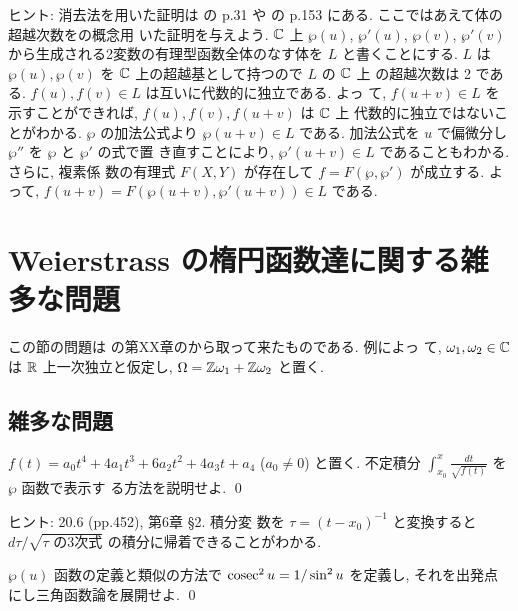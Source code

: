 \documentclass[12pt,twoside]{jarticle}
\def\pe{\wp}
\def\cosec{\mathop{\mbox{\rm cosec}}\nolimits}
\def\Z{{\Bbb Z}} %
\def\R{{\Bbb R}} %
\def\C{{\Bbb C}} %
\begin{document}
\noindent ヒント: 消去法を用いた証明は \cite{HC}の p.31 や 
\cite{Takeuchi} の p.153 にある. ここではあえて体の超越次数をの概念用
いた証明を与えよう. $\C$ 上 $\pe(u)$, $\pe'(u)$, $\pe(v)$, $\pe'(v)$ 
から生成される2変数の有理型函数全体のなす体を $L$ と書くことにする.
$L$ は $\pe(u),\pe(v)$ を $\C$ 上の超越基として持つので $L$ の $\C$ 上
の超越次数は 2 である. $f(u),f(v)\in L$ は互いに代数的に独立である. よっ
て, $f(u+v)\in L$ を示すことができれば, $f(u),f(v),f(u+v)$ は $\C$ 上
代数的に独立ではないことがわかる. $\pe$ の加法公式より $\pe(u+v)\in L$ 
である. 加法公式を $u$ で偏微分し $\pe''$ を $\pe$ と $\pe'$ の式で置
き直すことにより, $\pe'(u+v)\in L$ であることもわかる. さらに, 複素係
数の有理式 $F(X,Y)$ が存在して $f=F(\pe,\pe')$ が成立する. よって, %
$f(u+v)=F(\pe(u+v),\pe'(u+v))\in L$ である.


\section{Weierstrass の楕円函数達に関する雑多な問題}

この節の問題は \cite{WW} の第XX章のから取って来たものである. 例によっ
て, $\omega_1,\omega_2\in\C$ は $\R$ 上一次独立と仮定し, %
$\Omega=\Z\omega_1+\Z\omega_2$ と置く.


\subsection{雑多な問題}

\begin{question}
  $f(t)=a_0t^4+4a_1t^3+6a_2t^2+4a_3t+a_4$ ($a_0\ne0$) と置く. %
  不定積分 $\int_{x_0}^x \frac{dt}{\sqrt{f(t)}}$ を $\pe$ 函数で表示す
  る方法を説明せよ. \qed 
\end{question}

\noindent ヒント: \cite{WW} 20.6 (pp.452), \cite{HC} 第6章 \S2. 積分変
数を $\tau=(t-x_0)^{-1}$ と変換すると $d\tau/\sqrt{\text{$\tau$ の3次式}}$ 
の積分に帰着できることがわかる.

\begin{question}
  $\pe(u)$ 函数の定義と類似の方法で $\cosec^2 u = 1/\sin^2 u$ を定義し, 
  それを出発点にし三角函数論を展開せよ. \qed
\end{question}
\end{document}
